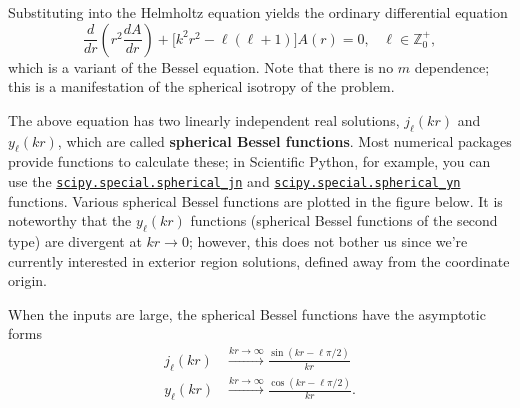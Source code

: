 \documentclass[pra,12pt]{revtex4}
\begin{document}
Substituting into the Helmholtz equation yields the ordinary
differential equation
$$\frac{d}{dr}\left(r^2\frac{dA}{dr}\right) + \Big[k^2r^2 - \ell(\ell+1)\Big] A(r) = 0, \;\;\;\ell \in \mathbb{Z}_0^+,$$
which is a variant of the Bessel equation.  Note that there is no $m$
dependence; this is a manifestation of the spherical isotropy of the
problem.

The above equation has two linearly independent real solutions,
$j_\ell(kr)$ and $y_\ell(kr)$, which are called \textbf{spherical Bessel
  functions}.  Most numerical packages provide functions to calculate
these; in Scientific Python, for example, you can use the
\href{https://docs.scipy.org/doc/scipy/reference/generated/scipy.special.spherical_jn.html}{\texttt{scipy.special.spherical\_jn}}
and
\href{https://docs.scipy.org/doc/scipy/reference/generated/scipy.special.spherical_yn.html}{\texttt{scipy.special.spherical\_yn}}
functions.  Various spherical Bessel functions are plotted in the
figure below.  It is noteworthy that the $y_\ell(kr)$ functions
(spherical Bessel functions of the second type) are divergent at
$kr\rightarrow 0$; however, this does not bother us since we're
currently interested in exterior region solutions, defined away from
the coordinate origin.


When the inputs are large, the spherical Bessel functions have the
asymptotic forms
$$\begin{aligned}j_\ell(kr) &\overset{kr\rightarrow\infty}{\longrightarrow} \frac{\sin(kr-\ell\pi/2)}{kr} \\ y_\ell(kr) &\overset{kr\rightarrow\infty}{\longrightarrow} \frac{\cos(kr-\ell\pi/2)}{kr}.\end{aligned}$$
\end{document}
